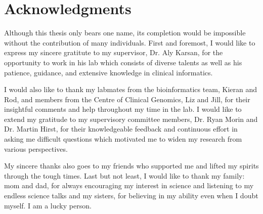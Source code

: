 
\chapter{Acknowledgments}

Although this thesis only bears one name, its completion would be impossible without the contribution of many individuals. First and foremost, I would like to express my sincere gratitute to my supervisor, Dr. Aly Karsan, for the opportunity to work in his lab which consists of diverse talents as well as his patience, guidance, and extensive knowledge in clinical informatics. 

I would also like to thank my labmates from the bioinformatics team, Kieran and Rod, and members from the Centre of Clinical Genomics, Liz and Jill, for their insightful comments and help throughout my time in the lab. I would like to extend my gratitude to my supervisory committee members, Dr. Ryan Morin and Dr. Martin Hirst, for their knowledgeable feedback and continuous effort in asking me difficult questions which motivated me to widen my research from various perspectives. 

My sincere thanks also goes to my friends who supported me and lifted my spirits through the tough times. Last but not least, I would like to thank my family: mom and dad, for always encouraging my interest in science and listening to my endless science talks and my sisters, for believing in my ability even when I doubt myself. I am a lucky person. 
